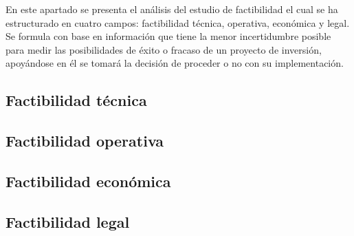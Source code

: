 En este apartado se presenta el análisis del estudio de factibilidad el cual se ha estructurado en cuatro campos: factibilidad técnica, operativa, económica y legal.  Se formula con base en información que tiene la menor incertidumbre posible para medir las posibilidades de éxito o fracaso de un proyecto de inversión, apoyándose en él se tomará la decisión de proceder o no con su implementación. 

\subsection{Factibilidad técnica}
\label{sec:factibilidad_tecnica}


\subsection{Factibilidad operativa}
\label{sec:factibilidad_operativa}


\subsection{Factibilidad económica}
\label{sec:factibilidad_economica}


\subsection{Factibilidad legal}
\label{sec:factibilidad_legal}


%



